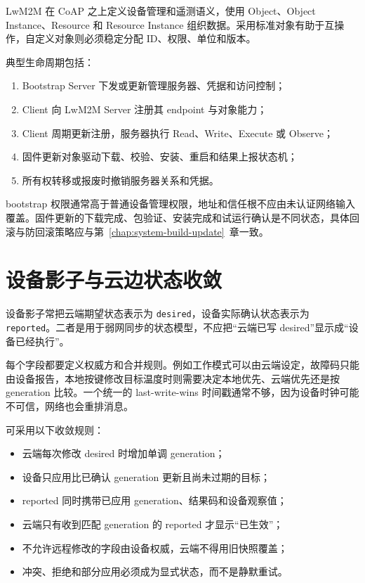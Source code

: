 LwM2M 在 CoAP 之上定义设备管理和遥测语义，使用 Object、Object Instance、Resource 和 Resource Instance 组织数据\cite{oma-lwm2m}。采用标准对象有助于互操作，自定义对象则必须稳定分配 ID、权限、单位和版本。

典型生命周期包括：

\begin{enumerate}
  \item Bootstrap Server 下发或更新管理服务器、凭据和访问控制；
  \item Client 向 LwM2M Server 注册其 endpoint 与对象能力；
  \item Client 周期更新注册，服务器执行 Read、Write、Execute 或 Observe；
  \item 固件更新对象驱动下载、校验、安装、重启和结果上报状态机；
  \item 所有权转移或报废时撤销服务器关系和凭据。
\end{enumerate}

bootstrap 权限通常高于普通设备管理权限，地址和信任根不应由未认证网络输入覆盖。固件更新的下载完成、包验证、安装完成和试运行确认是不同状态，具体回滚与防回滚策略应与\mbox{第~\ref{chap:system-build-update}~章}一致。

\section{设备影子与云边状态收敛}

设备影子常把云端期望状态表示为 \texttt{desired}，设备实际确认状态表示为 \texttt{reported}。二者是用于弱网同步的状态模型，不应把“云端已写 desired”显示成“设备已经执行”。

每个字段都要定义权威方和合并规则。例如工作模式可以由云端设定，故障码只能由设备报告，本地按键修改目标温度时则需要决定本地优先、云端优先还是按 generation 比较。一个统一的 last-write-wins 时间戳通常不够，因为设备时钟可能不可信，网络也会重排消息。

可采用以下收敛规则：

\begin{itemize}
  \item 云端每次修改 desired 时增加单调 generation；
  \item 设备只应用比已确认 generation 更新且尚未过期的目标；
  \item reported 同时携带已应用 generation、结果码和设备观察值；
  \item 云端只有收到匹配 generation 的 reported 才显示“已生效”；
  \item 不允许远程修改的字段由设备权威，云端不得用旧快照覆盖；
  \item 冲突、拒绝和部分应用必须成为显式状态，而不是静默重试。
\end{itemize}

